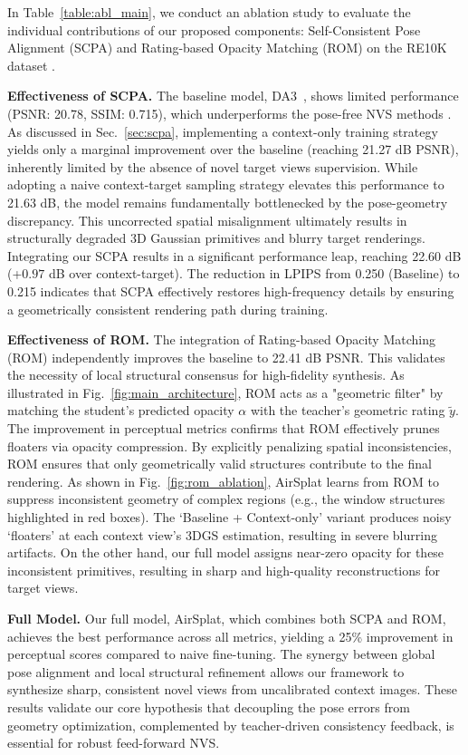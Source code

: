 In Table~\ref{table:abl_main}, we conduct an ablation study to evaluate the individual contributions of our proposed components: Self-Consistent Pose Alignment (SCPA) and Rating-based Opacity Matching (ROM) on the RE10K dataset \cite{zhou2018stereo}.

\noindent \textbf{Effectiveness of SCPA.}
The baseline model, DA3~\cite{lin2025da3}, shows limited performance (PSNR: 20.78, SSIM: 0.715), which underperforms the pose-free NVS methods \cite{liu2025worldmirror, ye2024no, ye2026yonosplat}. 
As discussed in Sec.~\ref{sec:scpa}, implementing a context-only training strategy yields only a marginal improvement over the baseline (reaching 21.27 dB PSNR), inherently limited by the absence of novel target views supervision. While adopting a naive context-target sampling strategy elevates this performance to 21.63 dB, the model remains fundamentally bottlenecked by the pose-geometry discrepancy. This uncorrected spatial misalignment ultimately results in structurally degraded 3D Gaussian primitives and blurry target renderings. Integrating our SCPA results in a significant performance leap, reaching 22.60 dB (+$0.97$ dB over context-target). 
The reduction in LPIPS from 0.250 (Baseline) to 0.215 indicates that SCPA effectively restores high-frequency details by ensuring a geometrically consistent rendering path during training.

\noindent \textbf{Effectiveness of ROM.}
The integration of Rating-based Opacity Matching (ROM) independently improves the baseline to 22.41 dB PSNR. This validates the necessity of local structural consensus for high-fidelity synthesis. As illustrated in Fig.~\ref{fig:main_architecture}, ROM acts as a "geometric filter" by matching the student's predicted opacity $\alpha$ with the teacher's geometric rating $\tilde{y}$. The improvement in perceptual metrics confirms that ROM effectively prunes floaters via opacity compression. 
By explicitly penalizing spatial inconsistencies, ROM ensures that only geometrically valid structures contribute to the final rendering.
As shown in Fig.~\ref{fig:rom_ablation}, AirSplat learns from ROM to suppress inconsistent geometry of complex regions (e.g., the window structures highlighted in red boxes).
The `Baseline + Context-only' variant produces noisy `floaters' at each context view's 3DGS estimation, resulting in severe blurring artifacts.
On the other hand, our full model assigns near-zero opacity for these inconsistent primitives, resulting in sharp and high-quality reconstructions for target views. 

\noindent \textbf{Full Model.}
Our full model, AirSplat, which combines both SCPA and ROM, achieves the best performance across all metrics, yielding a 25\% improvement in perceptual scores compared to naive fine-tuning. The synergy between global pose alignment and local structural refinement allows our framework to synthesize sharp, consistent novel views from uncalibrated context images. These results validate our core hypothesis that decoupling the pose errors from geometry optimization, complemented by teacher-driven consistency feedback, is essential for robust feed-forward NVS.